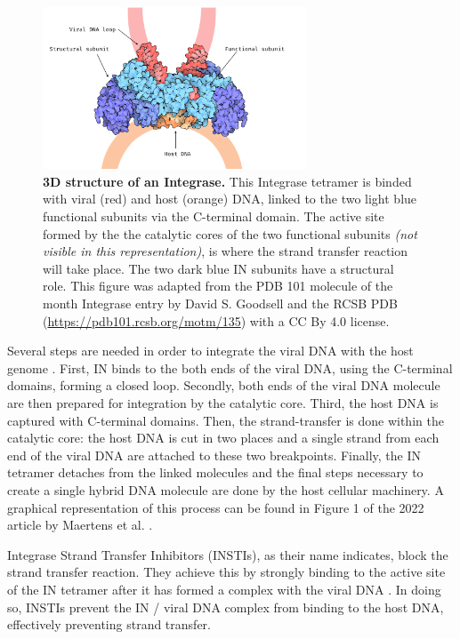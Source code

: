 \documentclass[
  11pt,
  twoside,
  BCOR=10mm,
  listof=totoc]{scrbook}
\newcommand{\extcaption}[2]{
    \caption[#1]{
        \textbf{#1}\newline
        #2
    }
}
\begin{document}
\begin{figure} 
  \centering 
  \includegraphics[width=0.7\textwidth]{./figures/HIV-Intro/in.png}      \extcaption{3D structure of an Integrase.}{This Integrase tetramer is binded with viral (red) and host (orange) DNA, linked to the two light blue functional subunits via the C-terminal domain. The active site formed by the the catalytic cores of the two functional subunits \textit{(not visible in this representation)}, is where the strand transfer reaction will take place. The two dark blue IN subunits have a structural role.
  This figure was adapted from the PDB 101 molecule of the month Integrase entry by David S. Goodsell and the RCSB PDB (\url{https://pdb101.rcsb.org/motm/135}) with a CC By 4.0 license.}       
  \label{fig:inStruct} 
\end{figure}

Several steps are needed in order to integrate the viral DNA with the host genome \autocite{maertensStructureFunctionRetroviral2022}. First, IN binds to the both ends of the viral DNA, using the C-terminal domains, forming a closed loop. Secondly, both ends of the viral DNA molecule are then prepared for integration by the catalytic core. Third, the host DNA is captured with C-terminal domains. Then, the strand-transfer is done within the catalytic core: the host DNA is cut in two places and a single strand from each end of the viral DNA are attached to these two breakpoints. Finally, the IN tetramer detaches from the linked molecules and the final steps necessary to create a single hybrid DNA molecule are done by the host cellular machinery. A graphical representation of this process can be found in Figure 1 of the 2022 article by Maertens et al. \autocite{maertensStructureFunctionRetroviral2022}.

Integrase Strand Transfer Inhibitors (INSTIs), as their name indicates, block the strand transfer reaction. They achieve this by strongly binding to the active site of the IN tetramer after it has formed a complex with the viral DNA \autocite{pommierIntegraseInhibitorsTreat2005,maertensStructureFunctionRetroviral2022}. In doing so, INSTIs prevent the IN / viral DNA complex from binding to the host DNA, effectively preventing strand transfer.
\end{document}
